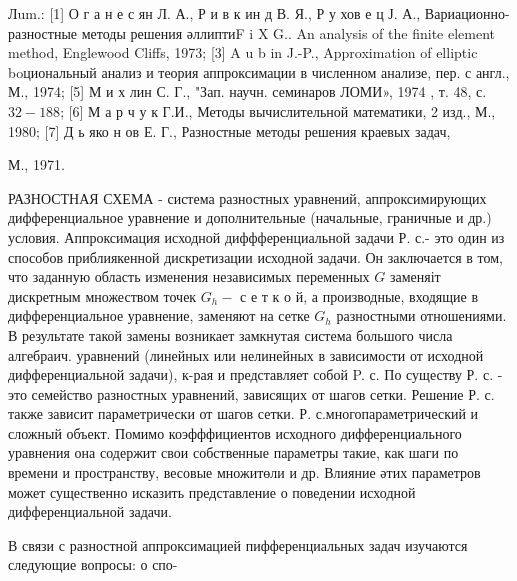 \documentclass[10pt]{article}
\begin{document}
Лum.: [1] О г а н е с ян Л. А., Р и в к ин д В. Я., Р у хов е ц Ј. А., Вариационно-разностные методы решения әллиптиF i X G.. An analysis of the finite element method, Englewood Cliffs, 1973; [3] A u b in J.-P., Approximation of elliptic boциональный анализ и теория аппроксимации в численном анализе, пер. с англ., М., 1974; [5] М и х лин С. Г., "Зап. научн. семинаров ЛОМИ», 1974 , т. 48, с. $32-188$; [6] М а р ч у к Г.И., Методы вычислительной математики, 2 изд., М., 1980; [7] Д ь яко н ов Е. Г., Разностные методы решения краевых задач,

М., 1971.



РАЗНОСТНАЯ СХЕМА - система разностных уравнений, аппроксимирующих дифференциальное уравнение и дополнительные (начальные, граничные и др.) условия. Аппроксимация исходной диффференциальной задачи Р. с.- это один из способов приблиякенной дискретизации исходной задачи. Он заключается в том, что заданную область изменения независимых переменных $G$ заменяіт дискретным множеством точек $G_{h}-$ с е т к о й, а производные, входящие в дифференциальное уравнение, заменяют на сетке $G_{h}$ разностными отношениями. В результате такой замены возникает замкнутая система большого числа алгебраич. уравнений (линейных или нелинейных в зависимости от исходной дифференциальной задачи), к-рая и представляет собой P. с. По существу Р. с. - это семейство разностных уравнений, зависящих от шагов сетки. Решение Р. с. также зависит параметрически от шагов сетки. Р. с.многопараметрический и сложный объект. Помимо коэфффициентов исходного дифференциального уравнения она содержит свои собственные параметры такие, как шаги по времени и пространству, весовые множитөли и др. Влияние әтих параметров может существенно исказить представление о поведении исходной дифференциальной задачи.



В связи с разностной аппроксимацией пифференциальных задач изучаются следующие вопросы: о спо-
\end{document}
